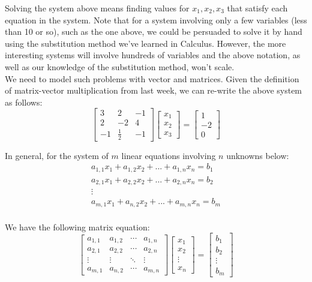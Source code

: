 \documentclass[11pt,a4paper,oneside]{report}
\begin{document}
Solving the system above means finding values for $x_1, x_2, x_3$ that satisfy each equation in the system. Note that for a system involving only a few variables (less than 10 or so), such as the one above, we could be persuaded to solve it by hand using the substitution method we've learned in Calculus. However, the more interesting systems will involve hundreds of variables and the above notation, as well as our knowledge of the substitution method, won't scale.\\

We need to model such problems with vector and matrices. Given the definition of matrix-vector multiplication from last week, we can re-write the above system as follows:
\[
\begin{bmatrix}
3 & 2 & -1\\
2 & -2 & 4\\
-1 & \frac{1}{2} & -1
\end{bmatrix}
\begin{bmatrix}
x_1\\
x_2\\
x_3
\end{bmatrix}
=
\begin{bmatrix}
1\\
-2\\
0
\end{bmatrix}
\]

In general, for the system of $m$ linear equations involving $n$ unknowns below:
\begin{eqnarray*}
a_{1,1}x_1 + a_{1,2}x_2 + ... + a_{1,n}x_n = b_1\\
a_{2,1}x_1 + a_{2,2}x_2 + ... + a_{2,n}x_n = b_2\\
\vdots \\
a_{m,1}x_1 + a_{n,2}x_2 + ... + a_{m,n}x_n = b_m\\
\end{eqnarray*}

We have the following matrix equation:
\[
 \begin{bmatrix}
  a_{1,1} & a_{1,2} & \cdots & a_{1,n} \\
  a_{2,1} & a_{2,2} & \cdots & a_{2,n} \\
  \vdots  & \vdots  & \ddots & \vdots  \\
  a_{m,1} & a_{n,2} & \cdots & a_{m,n}
 \end{bmatrix}
 \begin{bmatrix}
 x_1 \\ x_2 \\ \vdots \\ x_n
 \end{bmatrix}
 =
 \begin{bmatrix}
 b_1 \\ b_2 \\ \vdots \\ b_m
 \end{bmatrix}
\] 
\end{document}

